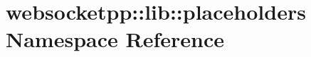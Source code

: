 \hypertarget{namespacewebsocketpp_1_1lib_1_1placeholders}{}\section{websocketpp\+:\+:lib\+:\+:placeholders Namespace Reference}
\label{namespacewebsocketpp_1_1lib_1_1placeholders}
